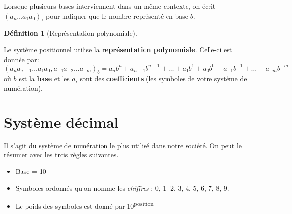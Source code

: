 \documentclass[
  letterpaper,
]{scrbook}
\providecommand{\tightlist}{%
  \setlength{\itemsep}{0pt}\setlength{\parskip}{0pt}}\usepackage{longtable,booktabs,array}
\theoremstyle{plain}
\theoremstyle{definition}
\theoremstyle{definition}
\newtheorem{definition}{Définition}[chapter]
\theoremstyle{remark}
\begin{document}
\begin{tcolorbox}[enhanced jigsaw, opacityback=0, rightrule=.15mm, breakable, toprule=.15mm, colbacktitle=quarto-callout-note-color!10!white, title=\textcolor{quarto-callout-note-color}{\faInfo}\hspace{0.5em}{Note}, titlerule=0mm, arc=.35mm, colback=white, coltitle=black, colframe=quarto-callout-note-color-frame, bottomtitle=1mm, toptitle=1mm, bottomrule=.15mm, leftrule=.75mm, left=2mm, opacitybacktitle=0.6]

Lorsque plusieurs bases interviennent dans un même contexte, on écrit
\((a_n \ldots a_1a_0)_b\) pour indiquer que le nombre représenté en base
\(b\).

\end{tcolorbox}

\leavevmode{}%
\begin{definition}[Représentation
polynomiale]\label{def-representation-polynomiale}

Le système positionnel utilise la \textbf{représentation polynomiale}.
Celle-ci est donnée par: \[
(a_na_{n-1}\ldots a_1a_0,a_{-1}a_{-2}\ldots a_{-m})_b = a_nb^n+a_{n-1}b^{n-1}+\ldots +a_1b^1+a_0b^0+a_{-1}b^{-1}+\ldots +a_{-m}b^{-m}
\] où \(b\) est la \textbf{base} et les \(a_i\) sont des
\textbf{coefficients} (les symboles de votre système de numération).

\end{definition}

\hypertarget{systuxe8me-duxe9cimal}{%
\section{Système décimal}\label{systuxe8me-duxe9cimal}}

Il s'agit du système de numération le plus utilisé dans notre société.
On peut le résumer avec les trois règles suivantes.

\begin{itemize}
\tightlist
\item
  Base = 10
\item
  Symboles ordonnés qu'on nomme les \emph{chiffres} : 0, 1, 2, 3, 4, 5,
  6, 7, 8, 9.
\item
  Le poids des symboles est donné par 10\textsuperscript{position}
\end{itemize}
\end{document}
